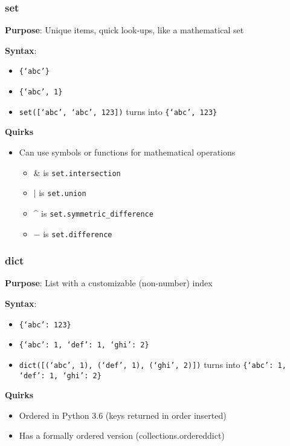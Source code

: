 \documentclass{beamer}
\begin{document}
\begin{frame}
  \frametitle{set} 

  \textbf{Purpose}: Unique items, quick look-ups, like a mathematical set

  \textbf{Syntax}: 
  \begin{itemize}
    \item \texttt{\{`abc'\}} 
    \item \texttt{\{`abc', 1\}}
    \item \texttt{set([`abc', `abc', 123])} turns into \texttt{\{`abc', 123\}}
  \end{itemize}

  \textbf{Quirks}
  \begin{itemize}
    \item Can use symbols or functions for mathematical operations
      \begin{itemize}
        \item \& is \texttt{set.intersection}
	\item $\vert$ is \texttt{set.union}
	\item \string^ is \texttt{set.symmetric\_difference}
	\item $-$ is \texttt{set.difference}
      \end{itemize}
  \end{itemize}
\end{frame}

\begin{frame}
  \frametitle{dict}
 
  \textbf{Purpose}: List with a customizable (non-number) index

  \textbf{Syntax}: 
  \begin{itemize}
    \item \texttt{\{`abc': 123\}} 
    \item \texttt{\{`abc': 1, `def': 1, `ghi': 2\}}
    \item \texttt{dict([(`abc', 1), (`def', 1), (`ghi', 2)])}
          turns into \texttt{\{`abc': 1, `def': 1, `ghi': 2\}}
  \end{itemize}

  \textbf{Quirks}
  \begin{itemize}
    \item Ordered in Python 3.6 (keys returned in order inserted)
    \item Has a formally ordered version (collections.ordereddict)
  \end{itemize}
\end{frame}
\end{document}
